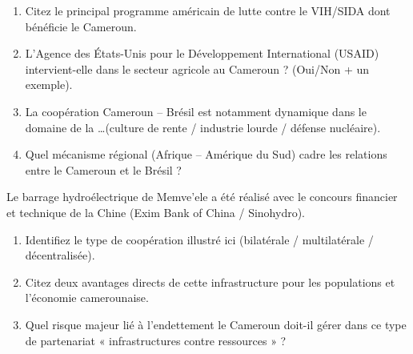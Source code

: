 \documentclass[11pt]{article}
\begin{document}
\begin{exercice}
\begin{enumerate}
    \item Citez le principal programme américain de lutte contre le VIH/SIDA dont bénéficie le Cameroun.
    \item L'Agence des États-Unis pour le Développement International (USAID) intervient-elle dans le secteur agricole au Cameroun ? (Oui/Non + un exemple).
    \item La coopération Cameroun -- Brésil est notamment dynamique dans le domaine de la \ldots (culture de rente / industrie lourde / défense nucléaire).
    \item Quel mécanisme régional (Afrique -- Amérique du Sud) cadre les relations entre le Cameroun et le Brésil ?
\end{enumerate}
\end{exercice}

\begin{exercice}
Le barrage hydroélectrique de Memve'ele a été réalisé avec le concours financier et technique de la Chine (Exim Bank of China / Sinohydro).
\begin{enumerate}
    \item Identifiez le type de coopération illustré ici (bilatérale / multilatérale / décentralisée).
    \item Citez deux avantages directs de cette infrastructure pour les populations et l'économie camerounaise.
    \item Quel risque majeur lié à l'endettement le Cameroun doit-il gérer dans ce type de partenariat « infrastructures contre ressources » ?
\end{enumerate}
\end{exercice}
\end{document}
